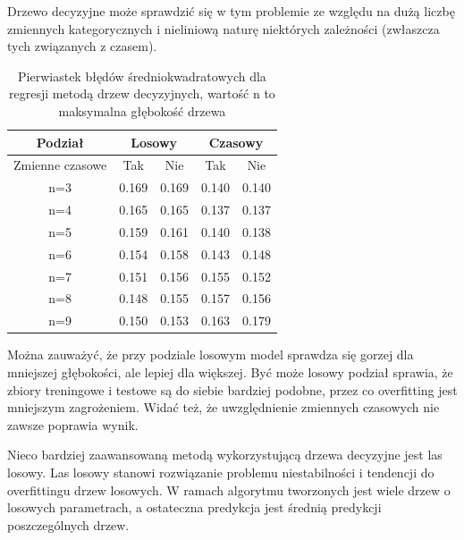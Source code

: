 \documentclass[18pt, letterpaper]{article}
\begin{document}
Drzewo decyzyjne może sprawdzić się w tym problemie ze względu na dużą liczbę zmiennych kategorycznych i nieliniową naturę niektórych zależności (zwłaszcza tych związanych z czasem).

\begin{table}[H]
\centering
\begin{tabular}{|c|cc|cc|}
\hline
Podział         & \multicolumn{2}{c|}{Losowy}        & \multicolumn{2}{c|}{Czasowy}       \\ \hline
Zmienne czasowe & \multicolumn{1}{c|}{Tak}   & Nie   & \multicolumn{1}{c|}{Tak}   & Nie   \\ \hline
n=3             & \multicolumn{1}{c|}{0.169} & 0.169 & \multicolumn{1}{c|}{0.140} & 0.140 \\ \hline
n=4             & \multicolumn{1}{c|}{0.165} & 0.165 & \multicolumn{1}{c|}{0.137} & 0.137 \\ \hline
n=5             & \multicolumn{1}{c|}{0.159} & 0.161 & \multicolumn{1}{c|}{0.140} & 0.138 \\ \hline
n=6             & \multicolumn{1}{c|}{0.154} & 0.158 & \multicolumn{1}{c|}{0.143} & 0.148 \\ \hline
n=7             & \multicolumn{1}{c|}{0.151} & 0.156 & \multicolumn{1}{c|}{0.155} & 0.152 \\ \hline
n=8             & \multicolumn{1}{c|}{0.148} & 0.155 & \multicolumn{1}{c|}{0.157} & 0.156 \\ \hline
n=9             & \multicolumn{1}{c|}{0.150} & 0.153 & \multicolumn{1}{c|}{0.163} & 0.179 \\ \hline
\end{tabular}
\caption{Pierwiastek błędów średniokwadratowych dla regresji metodą drzew decyzyjnych, wartość n to maksymalna głębokość drzewa}
\label{table:tree_results}
\end{table}

Można zauważyć, że przy podziale losowym model sprawdza się gorzej dla mniejszej głębokości, ale lepiej dla większej. Być może losowy podział sprawia, że zbiory treningowe i testowe są do siebie bardziej podobne, przez co overfitting jest mniejszym zagrożeniem. Widać też, że uwzględnienie zmiennych czasowych nie zawsze poprawia wynik.

Nieco bardziej zaawansowaną metodą wykorzystującą drzewa decyzyjne jest las losowy. Las losowy stanowi rozwiązanie problemu niestabilności i tendencji do overfittingu drzew losowych. W ramach algorytmu tworzonych jest wiele drzew o losowych parametrach, a ostateczna predykcja jest średnią predykcji poszczególnych drzew.
\end{document}
